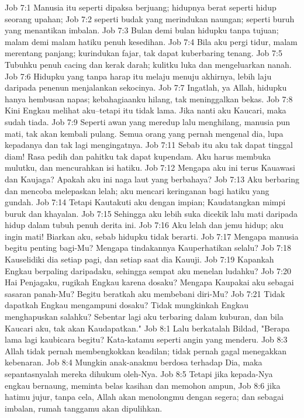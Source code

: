 Job 7:1  Manusia itu seperti dipaksa berjuang; hidupnya berat seperti hidup seorang upahan;
Job 7:2  seperti budak yang merindukan naungan; seperti buruh yang menantikan imbalan.
Job 7:3  Bulan demi bulan hidupku tanpa tujuan; malam demi malam hatiku penuh kesedihan.
Job 7:4  Bila aku pergi tidur, malam merentang panjang; kurindukan fajar, tak dapat kuberbaring tenang.
Job 7:5  Tubuhku penuh cacing dan kerak darah; kulitku luka dan mengeluarkan nanah.
Job 7:6  Hidupku yang tanpa harap itu melaju menuju akhirnya, lebih laju daripada penenun menjalankan sekocinya.
Job 7:7  Ingatlah, ya Allah, hidupku hanya hembusan napas; kebahagiaanku hilang, tak meninggalkan bekas.
Job 7:8  Kini Engkau melihat aku--tetapi itu tidak lama. Jika nanti aku Kaucari, maka sudah tiada.
Job 7:9  Seperti awan yang meredup lalu menghilang, manusia pun mati, tak akan kembali pulang. Semua orang yang pernah mengenal dia, lupa kepadanya dan tak lagi mengingatnya.
Job 7:11  Sebab itu aku tak dapat tinggal diam! Rasa pedih dan pahitku tak dapat kupendam. Aku harus membuka mulutku, dan mencurahkan isi hatiku.
Job 7:12  Mengapa aku ini terus Kauawasi dan Kaujaga? Apakah aku ini naga laut yang berbahaya?
Job 7:13  Aku berbaring dan mencoba melepaskan lelah; aku mencari keringanan bagi hatiku yang gundah.
Job 7:14  Tetapi Kautakuti aku dengan impian; Kaudatangkan mimpi buruk dan khayalan.
Job 7:15  Sehingga aku lebih suka dicekik lalu mati daripada hidup dalam tubuh penuh derita ini.
Job 7:16  Aku lelah dan jemu hidup; aku ingin mati! Biarkan aku, sebab hidupku tidak berarti.
Job 7:17  Mengapa manusia begitu penting bagi-Mu? Mengapa tindakannya Kauperhatikan selalu?
Job 7:18  Kauselidiki dia setiap pagi, dan setiap saat dia Kauuji.
Job 7:19  Kapankah Engkau berpaling daripadaku, sehingga sempat aku menelan ludahku?
Job 7:20  Hai Penjagaku, rugikah Engkau karena dosaku? Mengapa Kaupakai aku sebagai sasaran panah-Mu? Begitu beratkah aku membebani diri-Mu?
Job 7:21  Tidak dapatkah Engkau mengampuni dosaku? Tidak mungkinkah Engkau menghapuskan salahku? Sebentar lagi aku terbaring dalam kuburan, dan bila Kaucari aku, tak akan Kaudapatkan."
Job 8:1  Lalu berkatalah Bildad, "Berapa lama lagi kaubicara begitu? Kata-katamu seperti angin yang menderu.
Job 8:3  Allah tidak pernah membengkokkan keadilan; tidak pernah gagal menegakkan kebenaran.
Job 8:4  Mungkin anak-anakmu berdosa terhadap Dia, maka sepantasnyalah mereka dihukum oleh-Nya.
Job 8:5  Tetapi jika kepada-Nya engkau bernaung, meminta belas kasihan dan memohon ampun,
Job 8:6  jika hatimu jujur, tanpa cela, Allah akan menolongmu dengan segera; dan sebagai imbalan, rumah tanggamu akan dipulihkan.
